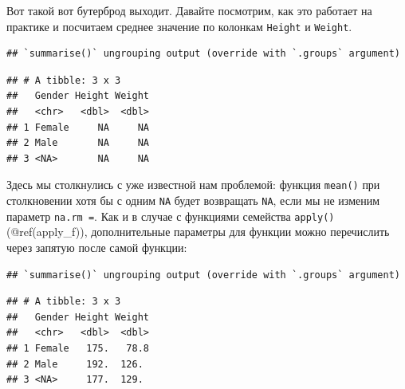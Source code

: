 \documentclass[]{book}
\newenvironment{Shaded}{\begin{snugshade}}{\end{snugshade}}
\newcommand{\KeywordTok}[1]{\textcolor[rgb]{0.13,0.29,0.53}{\textbf{#1}}}
\newcommand{\DataTypeTok}[1]{\textcolor[rgb]{0.13,0.29,0.53}{#1}}
\newcommand{\StringTok}[1]{\textcolor[rgb]{0.31,0.60,0.02}{#1}}
\newcommand{\OtherTok}[1]{\textcolor[rgb]{0.56,0.35,0.01}{#1}}
\newcommand{\OperatorTok}[1]{\textcolor[rgb]{0.81,0.36,0.00}{\textbf{#1}}}
\newcommand{\NormalTok}[1]{#1}
\begin{document}
Вот такой вот бутерброд выходит. Давайте посмотрим, как это работает на
практике и посчитаем среднее значение по колонкам \texttt{Height} и
\texttt{Weight}.

\begin{Shaded}
\end{Shaded}

\begin{verbatim}
## `summarise()` ungrouping output (override with `.groups` argument)
\end{verbatim}

\begin{verbatim}
## # A tibble: 3 x 3
##   Gender Height Weight
##   <chr>   <dbl>  <dbl>
## 1 Female     NA     NA
## 2 Male       NA     NA
## 3 <NA>       NA     NA
\end{verbatim}

Здесь мы столкнулись с уже известной нам проблемой: функция
\texttt{mean()} при столкновении хотя бы с одним \texttt{NA} будет
возвращать \texttt{NA}, если мы не изменим параметр \texttt{na.rm\ =}.
Как и в случае с функциями семейства \texttt{apply()} (@ref(apply\_f)),
дополнительные параметры для функции можно перечислить через запятую
после самой функции:

\begin{Shaded}
\end{Shaded}

\begin{verbatim}
## `summarise()` ungrouping output (override with `.groups` argument)
\end{verbatim}

\begin{verbatim}
## # A tibble: 3 x 3
##   Gender Height Weight
##   <chr>   <dbl>  <dbl>
## 1 Female   175.   78.8
## 2 Male     192.  126. 
## 3 <NA>     177.  129.
\end{verbatim}
\end{document}
